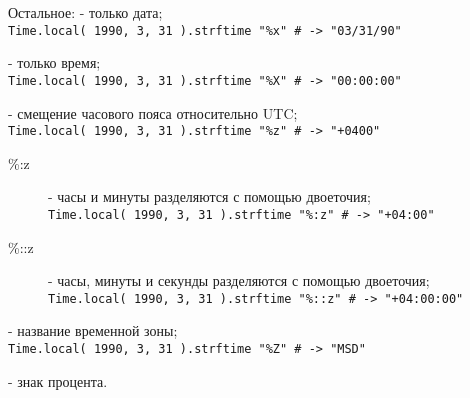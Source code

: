 \begin{keylist}{Остальное:}
   - только дата; 
  \\\verb!Time.local( 1990, 3, 31 ).strftime "%x" # -> "03/31/90"!    
   
   - только время; 
  \\\verb!Time.local( 1990, 3, 31 ).strftime "%X" # -> "00:00:00"!    
   
   - смещение часового пояса относительно UTC; 
  \\\verb!Time.local( 1990, 3, 31 ).strftime "%z" # -> "+0400"!
  \begin{description}
    \item[\%:z] - часы и минуты разделяются с помощью двоеточия;
    \\\verb!Time.local( 1990, 3, 31 ).strftime "%:z" # -> "+04:00"!
    \item[\%::z] - часы, минуты и секунды разделяются с помощью двоеточия;
    \\\verb!Time.local( 1990, 3, 31 ).strftime "%::z" # -> "+04:00:00"!
  \end{description}    
  
   - название временной зоны; 
  \\\verb!Time.local( 1990, 3, 31 ).strftime "%Z" # -> "MSD"!    
   
  \key{\%\%} - знак процента.
\end{keylist}